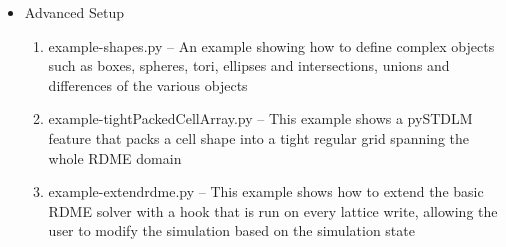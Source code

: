 \begin{itemize}
\item Advanced Setup
\begin{enumerate}
\item example-shapes.py -- An example showing how to define complex objects such as boxes, spheres, tori, ellipses and intersections, unions and differences of the various objects
\item example-tightPackedCellArray.py -- This example shows a pySTDLM feature that packs a cell shape into a tight regular grid spanning the whole RDME domain
\item example-extendrdme.py -- This example shows how to extend the basic RDME solver with a hook that is run on every lattice write, allowing the user to modify the simulation based on the simulation state
\end{enumerate}
\end{itemize}
